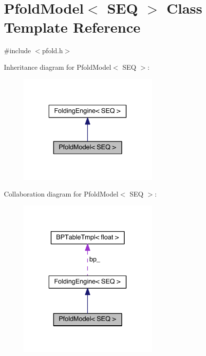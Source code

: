 \hypertarget{class_pfold_model}{\section{Pfold\+Model$<$ S\+E\+Q $>$ Class Template Reference}
\label{class_pfold_model}
}


{\ttfamily \#include $<$pfold.\+h$>$}



Inheritance diagram for Pfold\+Model$<$ S\+E\+Q $>$\+:
\nopagebreak
\begin{figure}[H]
\begin{center}
\leavevmode
\includegraphics[width=198pt]{class_pfold_model__inherit__graph}
\end{center}
\end{figure}


Collaboration diagram for Pfold\+Model$<$ S\+E\+Q $>$\+:
\nopagebreak
\begin{figure}[H]
\begin{center}
\leavevmode
\includegraphics[width=198pt]{class_pfold_model__coll__graph}
\end{center}
\end{figure}

